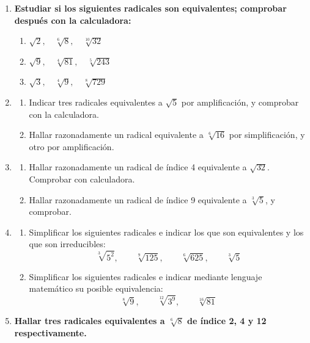 \documentclass[a4paper,12pt]{article}
\begin{document}
\begin{enumerate}
    \item \textbf{Estudiar si los siguientes radicales son equivalentes; comprobar después con la calculadora:}
    \begin{enumerate}[label=\alph*)]
        \item $\sqrt{2}, \quad \sqrt[6]{8}, \quad \sqrt[10]{32}$
        \item $\sqrt{9}, \quad \sqrt[4]{81}, \quad \sqrt[5]{243}$
        \item $\sqrt{3}, \quad \sqrt[4]{9}, \quad \sqrt[8]{729}$
    \end{enumerate}

    \item 
    \begin{enumerate}[label=\alph*)]
        \item Indicar tres radicales equivalentes a $\sqrt{5}$ por amplificación, y comprobar con la calculadora.
        \item Hallar razonadamente un radical equivalente a $\sqrt[6]{16}$ por simplificación, y otro por amplificación.
    \end{enumerate}

    \item 
    \begin{enumerate}[label=\alph*)]
        \item Hallar razonadamente un radical de índice 4 equivalente a $\sqrt{32}$. Comprobar con calculadora.
        \item Hallar razonadamente un radical de índice 9 equivalente a $\sqrt[3]{5}$, y comprobar.
    \end{enumerate}

    \item 
    \begin{enumerate}[label=\alph*)]
        \item Simplificar los siguientes radicales e indicar los que son equivalentes y los que son irreducibles:
        \[ \sqrt[3]{5^2}, \qquad \sqrt[9]{125}, \qquad \sqrt[6]{625}, \qquad \sqrt[3]{5} \]
        \item Simplificar los siguientes radicales e indicar mediante lenguaje matemático su posible equivalencia:
        \[ \sqrt[8]{9}, \qquad \sqrt[12]{3^9}, \qquad \sqrt[16]{81} \]
    \end{enumerate}

    \item \textbf{Hallar tres radicales equivalentes a $\sqrt[6]{8}$ de índice 2, 4 y 12 respectivamente.}
\end{enumerate}
\end{document}
